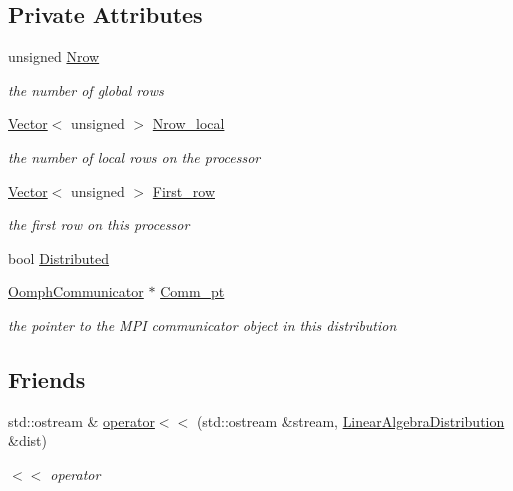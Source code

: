 \subsection*{Private Attributes}
\begin{DoxyCompactItemize}
\item 
unsigned \hyperlink{classoomph_1_1LinearAlgebraDistribution_a59d82db90a05edbf0444a31cc6b8f0b2}{Nrow}
\begin{DoxyCompactList}\small\item\em the number of global rows \end{DoxyCompactList}\item 
\hyperlink{classoomph_1_1Vector}{Vector}$<$ unsigned $>$ \hyperlink{classoomph_1_1LinearAlgebraDistribution_a3b9b16db35836dc06b160c0ddaa8e3fc}{Nrow\+\_\+local}
\begin{DoxyCompactList}\small\item\em the number of local rows on the processor \end{DoxyCompactList}\item 
\hyperlink{classoomph_1_1Vector}{Vector}$<$ unsigned $>$ \hyperlink{classoomph_1_1LinearAlgebraDistribution_a6dfae7ca9376aee99ca97d490a79dd9b}{First\+\_\+row}
\begin{DoxyCompactList}\small\item\em the first row on this processor \end{DoxyCompactList}\item 
bool \hyperlink{classoomph_1_1LinearAlgebraDistribution_a94492939a554e3415a477a13d0eb11c0}{Distributed}
\item 
\hyperlink{classoomph_1_1OomphCommunicator}{Oomph\+Communicator} $\ast$ \hyperlink{classoomph_1_1LinearAlgebraDistribution_a4ed739bdcab7465b2e7651a9e2a23ed8}{Comm\+\_\+pt}
\begin{DoxyCompactList}\small\item\em the pointer to the M\+PI communicator object in this distribution \end{DoxyCompactList}\end{DoxyCompactItemize}
\subsection*{Friends}
\begin{DoxyCompactItemize}
\item 
std\+::ostream \& \hyperlink{classoomph_1_1LinearAlgebraDistribution_a30dc1f50bb5c060c30c94281bcbe6815}{operator$<$$<$} (std\+::ostream \&stream, \hyperlink{classoomph_1_1LinearAlgebraDistribution}{Linear\+Algebra\+Distribution} \&dist)
\begin{DoxyCompactList}\small\item\em $<$$<$ operator \end{DoxyCompactList}\end{DoxyCompactItemize}


